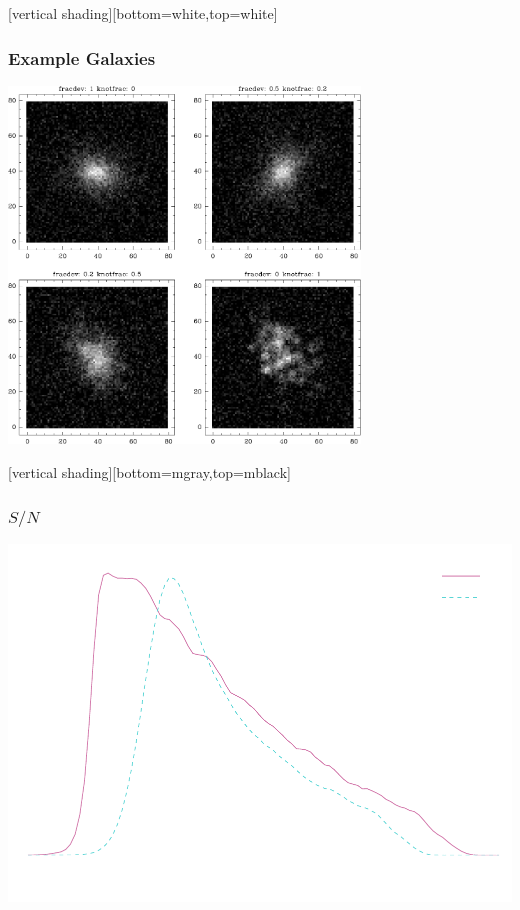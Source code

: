\documentclass{beamer}
\newcommand{\snr}{$S/N$}
\begin{document}
{

    [vertical shading][bottom=white,top=white]
    \frame
    {
        \frametitle{Example Galaxies}
     
        \begin{center}
            \includegraphics[width=0.7\textwidth]{mosaic-009086.pdf}
            \newline
        \end{center}

    }
    [vertical shading][bottom=mgray,top=mblack]

}



\frame
{
    \frametitle{\snr}
 
    \begin{center}
        \includegraphics[width=\textwidth]{run-bdj03mcal01-s2n-inv.pdf}
        \newline
    \end{center}



}
\end{document}
